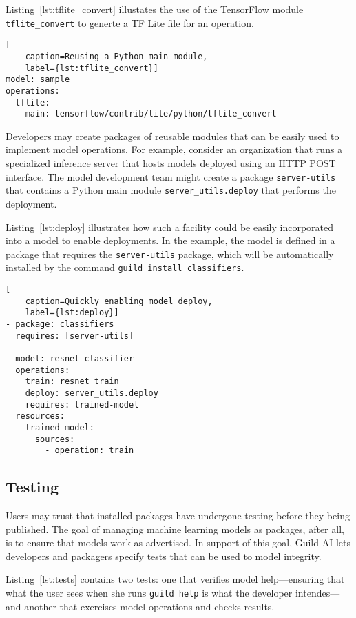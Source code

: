 \documentclass{article}
\begin{document}
Listing~\ref{lst:tflite_convert} illustates the use of the TensorFlow
module \verb|tflite_convert| to generte a TF Lite file for an
operation.

\begin{lstlisting}[
    caption=Reusing a Python main module,
    label={lst:tflite_convert}]
model: sample
operations:
  tflite:
    main: tensorflow/contrib/lite/python/tflite_convert
\end{lstlisting}

Developers may create packages of reusable modules that can be easily
used to implement model operations. For example, consider an
organization that runs a specialized inference server that hosts
models deployed using an HTTP POST interface. The model development
team might create a package \verb|server-utils| that contains a Python
main module \verb|server_utils.deploy| that performs the
deployment.

Listing~\ref{lst:deploy} illustrates how such a facility could be
easily incorporated into a model to enable deployments. In the
example, the model is defined in a package that requires the
\verb|server-utils| package, which will be automatically installed by
the command \verb|guild install classifiers|.

\begin{lstlisting}[
    caption=Quickly enabling model deploy,
    label={lst:deploy}]
- package: classifiers
  requires: [server-utils]

- model: resnet-classifier
  operations:
    train: resnet_train
    deploy: server_utils.deploy
    requires: trained-model
  resources:
    trained-model:
      sources:
        - operation: train
\end{lstlisting}

\subsection{Testing}

Users may trust that installed packages have undergone testing before
they being published. The goal of managing machine learning models as
packages, after all, is to ensure that models work as advertised. In
support of this goal, Guild AI lets developers and packagers specify
tests that can be used to model integrity.

Listing~\ref{lst:tests} contains two tests: one that verifies model
help---ensuring that what the user sees when she runs
\verb|guild help| is what the developer intendes---and another that
exercises model operations and checks results.
\end{document}
